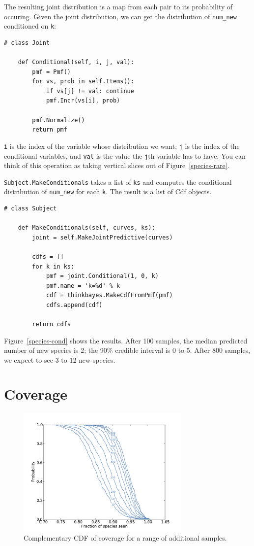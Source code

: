 \documentclass[12pt]{book}
\begin{document}
The resulting joint distribution is a map from each pair to
its probability of occuring.  Given the joint distribution, we
can get the distribution of \verb"num_new" conditioned on {\tt k}:

\begin{verbatim}
# class Joint

    def Conditional(self, i, j, val):
        pmf = Pmf()
        for vs, prob in self.Items():
            if vs[j] != val: continue
            pmf.Incr(vs[i], prob)

        pmf.Normalize()
        return pmf
\end{verbatim}

{\tt i} is the index of the variable whose distribution we want;
{\tt j} is the index of the conditional variables, and {\tt val}
is the value the {\tt j}th variable has to have.
You can think of this operation as taking vertical slices out
of Figure~\ref{species-rare}.

{\tt Subject.MakeConditionals} takes a list of {\tt ks}
and computes the conditional distribution of \verb"num_new"
for each {\tt k}.  The result is a list of Cdf objects.

\begin{verbatim}
# class Subject

    def MakeConditionals(self, curves, ks):
        joint = self.MakeJointPredictive(curves)

        cdfs = []
        for k in ks:
            pmf = joint.Conditional(1, 0, k)
            pmf.name = 'k=%d' % k
            cdf = thinkbayes.MakeCdfFromPmf(pmf)
            cdfs.append(cdf)

        return cdfs
\end{verbatim}

Figure~\ref{species-cond} shows the results.  After 100 samples, the
median predicted number of new species is 2; the 90\% credible
interval is 0 to 5.  After 800 samples, we expect to see 3 to 12 new
species.

\section{Coverage}

\begin{figure}
\centerline{\includegraphics[height=2.5in]{figs/species-frac-B1242.pdf}}
\caption{Complementary CDF of coverage for a range of additional samples.}
\label{species-frac}
\end{figure}
\end{document}
